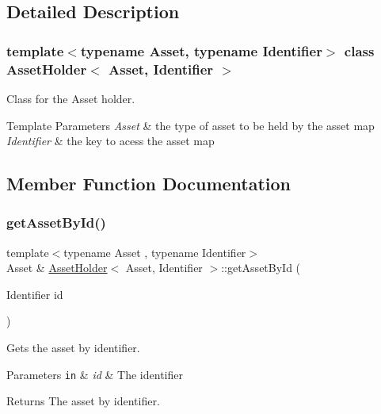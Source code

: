 \subsection{Detailed Description}
\subsubsection*{template$<$typename Asset, typename Identifier$>$\newline
class Asset\+Holder$<$ Asset, Identifier $>$}

Class for the Asset holder. 


\begin{DoxyTemplParams}{Template Parameters}
{\em Asset} & the type of asset to be held by the asset map \\
\hline
{\em Identifier} & the key to acess the asset map \\
\hline
\end{DoxyTemplParams}


\subsection{Member Function Documentation}
\mbox{\label{classAssetHolder_a73d1b14e75170e91a25d4f78a9494b0e}} 
\subsubsection{\texorpdfstring{get\+Asset\+By\+Id()}{getAssetById()}\hspace{0.1cm}{\footnotesize\ttfamily [1/2]}}
{\footnotesize\ttfamily template$<$typename Asset , typename Identifier$>$ \\
Asset \& \mbox{\hyperlink{classAssetHolder}{Asset\+Holder}}$<$ Asset, Identifier $>$\+::get\+Asset\+By\+Id (\begin{DoxyParamCaption}\item[{Identifier}]{id }\end{DoxyParamCaption})}



Gets the asset by identifier. 


\begin{DoxyParams}[1]{Parameters}
\mbox{\tt in}  & {\em id} & The identifier\\
\hline
\end{DoxyParams}
\begin{DoxyReturn}{Returns}
The asset by identifier. 
\end{DoxyReturn}
\mbox{\label{classAssetHolder_a6e31c8853bf2442e58224f445b2be4bf}} 
